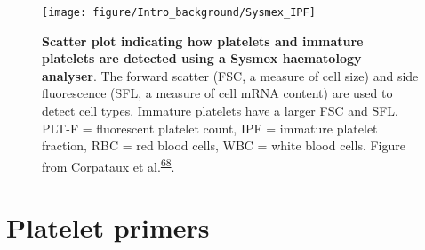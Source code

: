 \documentclass[11pt,twoside]{bristolthesis}
\begin{document}
\begin{figure}

{\centering \texttt{[image: figure/Intro\_background/Sysmex\_IPF]} 

}

\caption[Scatter plot indicating how platelets are immature platelets are detected using a Sysmex haematology analyser]{\textbf{Scatter plot indicating how platelets and immature platelets are detected using a Sysmex haematology analyser}. The forward scatter (FSC, a measure of cell size) and side fluorescence (SFL, a measure of cell mRNA content) are used to detect cell types. Immature platelets have a larger FSC and SFL. PLT-F = fluorescent platelet count, IPF = immature platelet fraction, RBC = red blood cells, WBC = white blood cells. Figure from Corpataux et al.\textsuperscript{\protect\hyperlink{ref-Corpataux2020}{68}}.}\label{fig:sysmex-ipf}
\end{figure}
\hypertarget{platelet-primers}{%
\section{Platelet primers}\label{platelet-primers}}
\end{document}
